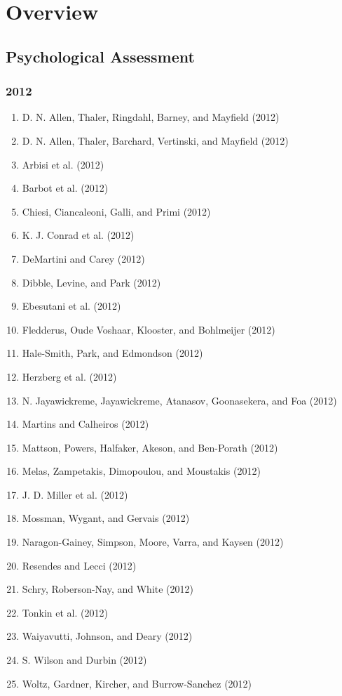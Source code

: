 \documentclass[english,man]{apa6}
\providecommand{\tightlist}{%
  \setlength{\itemsep}{0pt}\setlength{\parskip}{0pt}}
\theoremstyle{definition}
\theoremstyle{definition}
\theoremstyle{definition}
\theoremstyle{remark}
\begin{document}
\section{Overview}\label{overview}

\subsection{Psychological Assessment}\label{psychological-assessment}

\subsubsection{2012}\label{section-40}

\begin{enumerate}
\def\labelenumi{\arabic{enumi})}
\tightlist
\item
  D. N. Allen, Thaler, Ringdahl, Barney, and Mayfield (2012)
\item
  D. N. Allen, Thaler, Barchard, Vertinski, and Mayfield (2012)
\item
  Arbisi et al. (2012)
\item
  Barbot et al. (2012)
\item
  Chiesi, Ciancaleoni, Galli, and Primi (2012)
\item
  K. J. Conrad et al. (2012)
\item
  DeMartini and Carey (2012)
\item
  Dibble, Levine, and Park (2012)
\item
  Ebesutani et al. (2012)
\item
  Fledderus, Oude Voshaar, Klooster, and Bohlmeijer (2012)
\item
  Hale-Smith, Park, and Edmondson (2012)
\item
  Herzberg et al. (2012)
\item
  N. Jayawickreme, Jayawickreme, Atanasov, Goonasekera, and Foa (2012)
\item
  Martins and Calheiros (2012)
\item
  Mattson, Powers, Halfaker, Akeson, and Ben-Porath (2012)
\item
  Melas, Zampetakis, Dimopoulou, and Moustakis (2012)
\item
  J. D. Miller et al. (2012)
\item
  Mossman, Wygant, and Gervais (2012)
\item
  Naragon-Gainey, Simpson, Moore, Varra, and Kaysen (2012)
\item
  Resendes and Lecci (2012)
\item
  Schry, Roberson-Nay, and White (2012)
\item
  Tonkin et al. (2012)
\item
  Waiyavutti, Johnson, and Deary (2012)
\item
  S. Wilson and Durbin (2012)
\item
  Woltz, Gardner, Kircher, and Burrow-Sanchez (2012)
\end{enumerate}
\end{document}
